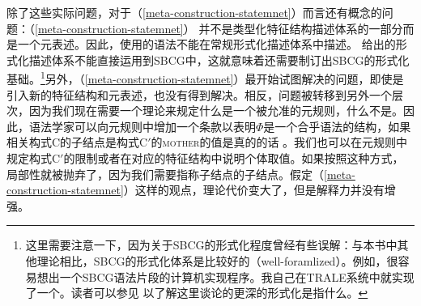 除了这些实际问题，对于（\ref{meta-construction-statemnet}）而言还有概念的问题：（\ref{meta-construction-statemnet}） 并不是类型化特征结构描述体系的一部分而是一个元表述。因此，使用\label{page-sbcg-formalization}的语法不能在常规形式化描述体系中描述。 \citet{Richter2004a-u}给出的形式化描述体系不能直接运用到SBCG中，这就意味着还需要制订出SBCG的形式化基础。\footnote{%
 这里需要注意一下，因为关于SBCG的形式化程度曾经有些误解：与本书中其他理论相比，SBCG的形式化体系是比较好的（well-foramlized）。例如，很容易想出一个SBCG语法片段的计算机实现程序。我自己在TRALE系统中就实现了一个。读者可以参见 \citet{Richter2004a-u}以了解这里谈论的更深的形式化是指什么。
}另外，（\ref{meta-construction-statemnet}）最开始试图解决的问题，即使是引入新的特征结构和元表述，也没有得到解决。相反，问题被转移到另外一个层次，因为我们现在需要一个理论来规定什么是一个被允准的元规则，什么不是。因此，语法学家可以向元规则中增加一个条款以表明$\Phi$是一个合乎语法的结构，如果相关构式C的子结点是构式C$'$的\textsc{mother}的值是真的的话 。我们也可以在元规则中规定构式C$'$的限制或者在对应的特征结构中说明个体取值。如果按照这种方式，局部性就被抛弃了，因为我们需要指称子结点的子结点。假定（\ref{meta-construction-statemnet}）这样的观点，理论代价变大了，但是解释力并没有增强。
